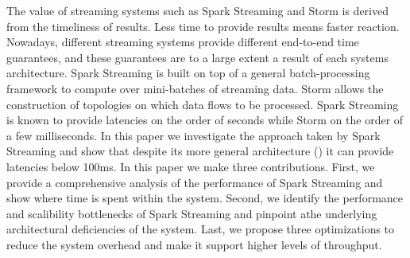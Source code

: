 \noindent The value of streaming systems such as Spark Streaming and Storm is derived from the timeliness of results. Less time to provide results means faster reaction. Nowadays, different streaming systems provide different end-to-end time guarantees, and these guarantees are to a large extent a result of each systems architecture. Spark Streaming is built on top of a general batch-processing framework to compute over mini-batches of streaming data. Storm allows the construction of topologies on which data flows to be processed. Spark Streaming is known to provide latencies on the order of seconds while Storm on the order of a few milliseconds. In this paper we investigate the approach taken by Spark Streaming and show that despite its more general architecture () it can provide latencies below 100ms. In this paper we make three contributions. First, we provide a comprehensive analysis of the performance of Spark Streaming and show where time is spent within the system. Second, we identify the performance and scalibility bottlenecks of Spark Streaming and pinpoint athe underlying architectural deficiencies of the system. Last, we propose three optimizations to reduce the system overhead and make it support higher levels of throughput.
        

